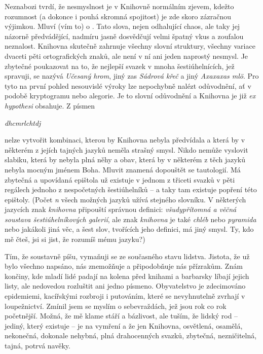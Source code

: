 \documentclass[11pt]{article}
\begin{document}
Neznabozi tvrdí, že nesmyslnost je v Knihovně normálním zjevem, kdežto rozumnost (a dokonce i pouhá skromná spojitost) je zde skoro zázračnou výjimkou. Mluví (vím to) o . Tato slova, nejen odhalující chaos, ale taky jej názorně předvádějící, nadmíru jasně dosvědčují velmi špatný vkus a zoufalou neznalost. Knihovna skutečně zahrnuje všechny slovní struktury, všechny variace dvaceti pěti ortografických znaků, ale není v ní ani jeden naprostý nesmysl. Je zbytečné poukazovat na to, že nejlepší svazek v mnoha šestiúhelnících, jež spravuji, se nazývá \textit{Učesaný hrom}, jiný zas \textit{Sádrová křeč} a jiný \textit{Axaxaxas mlö}. Pro tyto na první pohled nesouvislé výroky lze nepochybně nalézt odůvodnění, ať v podobě kryptogramu nebo alegorie. Je to slovní odůvodnění a Knihovna je již \textit{ex hypothesi} obsahuje. Z písmen
\begin{center}
\textit{dhcmrlchtdj}
\end{center}
\noindent
nelze vytvořit kombinaci, kterou by Knihovna nebyla předvídala a která by v některém z jejích tajných jazyků neměla strašný smysl. Nikdo nemůže vyslovit slabiku, která by nebyla plná něhy a obav, která by v některém z těch jazyků nebyla mocným jménem Boha. Mluvit znamená dopouštět se tautologií. Má zbytečná a upovídaná epištola už existuje v jednom z třiceti svazků v pěti regálech jednoho z nespočetných šestiúhelníků -- a taky tam existuje popření této epištoly. (Počet \textit{n} všech možných jazyků užívá stejného slovníku. V některých jazycích znak \textit{knihovna} připouští správnou definici: \textit{všudypřítomná a věčná soustava šestiúhelníkových galerií}, ale znak \textit{knihovna} je také \textit{chléb} nebo \textit{pyramida} nebo jakákoli jiná věc, a šest slov, tvořících jeho definici, má jiný smysl. Ty, kdo mě čteš, jsi si jist, že rozumíš mému jazyku?)

Tím, že soustavně píšu, vymaňuji se ze současného stavu lidstva. Jistota, že už bylo všechno napsáno, nás znemožňuje a připodobňuje nás přízrakům. Znám končiny, kde mladí lidé padají na kolena před knihami a barbarsky líbají jejich listy, ale nedovedou rozluštit ani jedno písmeno. Obyvatelstvo je zdecimováno epidemiemi, kacířskými rozbroji i putováním, které se nevyhnutelně zvrhají v loupežnictví. Zmínil jsem se myslím o sebevraždách, jež jsou rok co rok početnější. Možná, že mě klame stáří a bázlivost, ale tuším, že lidský rod -- jediný, který existuje -- je na vymření a že jen Knihovna, osvětlená, osamělá, nekonečná, dokonale nehybná, plná drahocenných svazků, zbytečná, nezničitelná, tajná, potrvá navěky.
\end{document}
